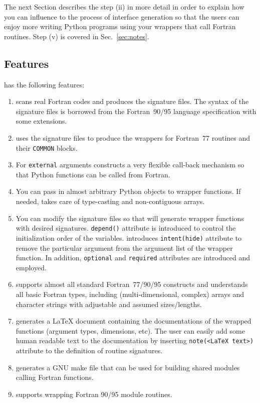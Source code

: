 The next Section describes the step (ii) in more detail in order to
explain how you can influence to the process of interface generation
so that the users can enjoy more writing Python programs using your
wrappers that call Fortran routines.  Step (v) is covered in
Sec.~\ref{sec:notes}.


\subsection{Features}
\label{sec:features}

\fpy has the following features:
\begin{enumerate}
\item \fpy scans real Fortran codes and produces the signature files.
  The syntax of the signature files is borrowed from the Fortran~90/95
  language specification with some extensions.
\item \fpy uses the signature files to produce the wrappers for
  Fortran~77 routines and their \texttt{COMMON} blocks.
\item For \texttt{external} arguments \fpy constructs a very flexible
  call-back mechanism so that Python functions can be called from
  Fortran.
\item You can pass in almost arbitrary Python objects to wrapper
  functions.  If needed, \fpy takes care of type-casting and
  non-contiguous arrays.
\item You can modify the signature files so that \fpy will generate
  wrapper functions with desired signatures.  \texttt{depend()}
  attribute is introduced to control the initialization order of the
  variables. \fpy introduces \texttt{intent(hide)} attribute to remove
  the particular argument from the argument list of the wrapper
  function.  In addition, \texttt{optional} and \texttt{required}
  attributes are introduced and employed.
\item \fpy supports almost all standard Fortran~77/90/95 constructs
  and understands all basic Fortran types, including
  (multi-dimensional, complex) arrays and character strings with
  adjustable and assumed sizes/lengths.
\item \fpy generates a LaTeX document containing the
  documentations of the wrapped functions (argument types, dimensions,
  etc). The user can easily add some human readable text to the
  documentation by inserting \texttt{note(<LaTeX text>)} attribute to
  the definition of routine signatures.
\item \fpy generates a GNU make file that can be used for building
  shared modules calling Fortran functions.
\item \fpy supports wrapping Fortran 90/95 module routines.
\end{enumerate}

